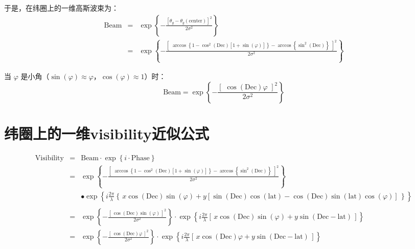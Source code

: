 \documentclass[11pt, a4paper]{article}  %
\begin{document}
\begin{CJK}{UTF8}{gbsn}
于是，在纬圈上的一维高斯波束为：
\begin{eqnarray} 
	\text{Beam} &=& \exp\left\{-\frac{\left[\theta_g - \theta_g(\text{center})\right]^2}{2\sigma^2}\right\} \nonumber \\
		&=& \exp\left\{ -\frac{\left[\,\, \arccos\left\{1-\cos^2(\text{Dec})\left[1+\sin(\varphi)\right]\right\} - \arccos\left\{\sin^2(\text{Dec})\right\} \,\,\right]^2}{2\sigma^2} \right\}
\end{eqnarray}

当 $\varphi$ 是小角（$\sin(\varphi) \approx \varphi$，$\cos(\varphi) \approx 1$）时：
\begin{equation} 
	\text{Beam} = \exp\left\{-\frac{ \left[\,\, \cos(\text{Dec})\varphi \,\,\right]^2 }{2\sigma^2}\right\}
\end{equation}





\section{纬圈上的一维visibility近似公式}

\begin{eqnarray}
	\text{Visibility} &=& \text{Beam}\cdot\exp\left\{i\cdot\text{Phase}\right\} \nonumber \\
		&=& \exp\left\{ -\frac{\left[\,\, \arccos\left\{1-\cos^2(\text{Dec})\left[1+\sin(\varphi)\right]\right\} - \arccos\left\{\sin^2(\text{Dec})\right\} \,\,\right]^2}{2\sigma^2} \right\} \nonumber \\ 
		&& \bullet \exp\left\{ i\frac{2\pi}{\lambda}  \left\{\, x\cos(\text{Dec})\sin(\varphi) + y\left[ \sin(\text{Dec})\cos(\text{lat}) - \cos(\text{Dec})\sin(\text{lat})\cos(\varphi) \right] \,\right\} \right\} \nonumber \\ \\ 
		&=& \exp\left\{-\frac{ \left[\, \cos(\text{Dec})\sin(\varphi) \,\right]^2 }{2\sigma^2}\right\} \cdot \exp\left\{ i\frac{2\pi}{\lambda} \left[\,x\cos(\text{Dec})\sin(\varphi) + y\sin(\text{Dec}-\text{lat})\,\right] \right\} \\ %
		&=& \exp\left\{-\frac{ \left[\, \cos(\text{Dec})\varphi \,\right]^2 }{2\sigma^2}\right\} \cdot \exp\left\{ i\frac{2\pi}{\lambda} \left[\,x\cos(\text{Dec})\varphi + y\sin(\text{Dec}-\text{lat})\,\right] \right\}
\end{eqnarray}




\end{CJK}
\end{document}
